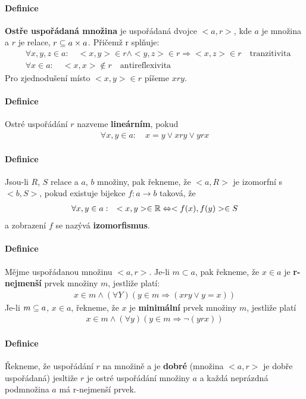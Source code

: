 \documentclass[a4paper,12pt,titlepage]{article}
\begin{document}
\paragraph{Definice}
\textbf{Ostře uspořádaná množina} je uspořádaná dvojce $<a, r>$, kde $a$ je
množina a $r$ je relace, $r \subseteq a \times a $. Přičemž r splňuje:
\begin{align}
	&\forall x, y, z \in a : \quad <x,y> \in r \land <y,z> \in r \Rightarrow
	<x,z> \in r \quad \text{tranzitivita} \\
	&\forall x \in a: \quad <x,x> \nin r \quad \text{antireflexivita}
\end{align}
Pro zjednodušení místo $<x,y> \in r$ píšeme $x r y$.
\paragraph{Definice}
Ostré uspořádání $r$ nazveme \textbf{lineárním}, pokud 
\begin{align}
	\forall x,y \in a: \quad x = y \lor x r y \lor y r x 
\end{align}
\paragraph{Definice}
Jsou-li $R$, $S$ relace a $a$, $b$ množiny, pak řekneme, že $<a, R>$ je izomorfní
s $<b, S>$, pokud existuje bijekce $f: a\to b$ taková, že
\begin{align}
	\forall x,y \in a: \quad <x,y> \in \mathbb{R} \Leftrightarrow <f(x), f(y)> \in S
\end{align}
a zobrazení $f$ se nazývá \textbf{izomorfismus}.
\paragraph{Definice}
Mějme uspořádanou množinu $<a,r>$. Je-li $m \subset a$, pak řekneme, že $x \in a$
je \textbf{r-nejmenší} prvek množiny $m$, jestliže platí:
\begin{align}
	x \in m \land (\forall Y) (y \in m \Rightarrow (x r y \lor y = x))
\end{align}
Je-li $m \subseteq a$, $x \in a$, řekneme, že $x$ je \textbf{minimální} prvek
množiny $m$,
jestliže platí
\begin{align}
	x \in m \land (\forall y) ( y \in m \Rightarrow \neg (y r x))
\end{align}
\paragraph{Definice}
Řekneme, že uspořádání $r$ na množině a je \textbf{dobré} (množina $<a,r>$ je dobře
uspořádaná) jesltiže $r$ je ostré uspořádání množiny $a$ a každá neprázdná
podmnožina $a$ má r-nejmenší prvek.
\end{document}

